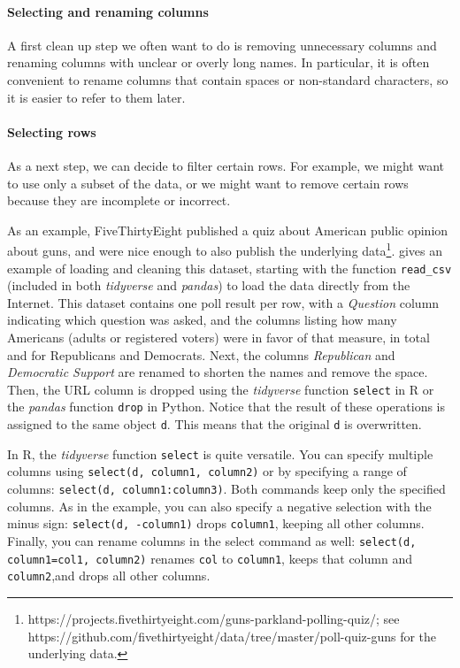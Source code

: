 \paragraph{Selecting and renaming columns}
A first clean up step we often want to do is removing unnecessary columns and renaming columns with unclear or overly long names.
In particular, it is often convenient to rename columns that contain spaces or non-standard characters, so it is easier to refer to them later.

\paragraph{Selecting rows}
As a next step, we can decide to filter certain rows.
For example, we might want to use only a subset of the data,
or we might want to remove certain rows because they are incomplete or incorrect.

As an example, FiveThirtyEight published a quiz about American public opinion about guns,
and were nice enough to also publish the underlying data\footnote{https://projects.fivethirtyeight.com/guns-parkland-polling-quiz/; see https://github.com/fivethirtyeight/data/tree/master/poll-quiz-guns for the underlying data.}.
 gives an example of loading and cleaning this dataset, starting with the function \texttt{read\_csv} (included in both \emph{tidyverse} and \emph{pandas}) to load the data directly from the Internet.
This dataset contains one poll result per row, with a \emph{Question} column indicating which question was asked,
and the columns listing how many Americans (adults or registered voters) were in favor of that measure, in total and for Republicans and Democrats.
Next, the columns \emph{Republican} and \emph{Democratic Support} are renamed to shorten the names and remove the space.
Then, the URL column is dropped using the \emph{tidyverse} function \texttt{select} in R or the \emph{pandas} function \texttt{drop} in Python.
Notice that the result of these operations is assigned to the same object \texttt{d}.
This means that the original \texttt{d} is overwritten.

\begin{feature}
  In R, the \emph{tidyverse} function \texttt{select} is quite versatile.
  You can specify multiple columns using \verb|select(d, column1, column2)|
  or by specifying a range of columns: \verb|select(d, column1:column3)|.
  Both commands keep only the specified columns.
  As in the example, you can also specify a negative selection with the minus sign:
  \verb|select(d, -column1)| drops \texttt{column1}, keeping all other columns.
  Finally, you can rename columns in the select command as well:
  \verb|select(d, column1=col1, column2)| renames \texttt{col} to \texttt{column1},
  keeps that column and \texttt{column2},and drops all other columns.
\end{feature}

